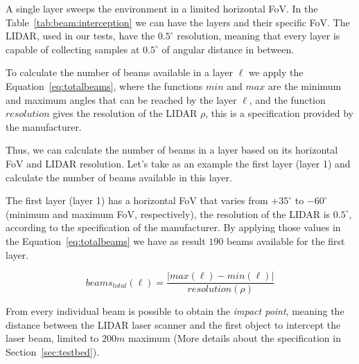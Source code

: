 A single layer sweeps the environment in a limited horizontal FoV. In the Table~\ref{tab:beam:interception} we can have the layers and their specific FoV. The LIDAR, used in our tests, have the $0.5^{\circ}$ resolution, meaning that every layer is capable of collecting samples at $0.5^{\circ}$ of angular distance in between. 

To calculate the number of beams available in a layer $\ell$ we apply the Equation~\ref{eq:totalbeams}, where the functions $min$ and $max$ are the minimum and maximum angles that can be reached by the layer $\ell$, and the function $resolution$ gives the resolution of the LIDAR $\rho$, this is a specification provided by the manufacturer. 

Thus, we can calculate the number of beams in a layer based on its horizontal FoV and LIDAR resolution. Let's take as an example the first layer (layer 1) and calculate the number of beams available in this layer. 

The first layer (layer 1) has a horizontal FoV that varies from $+35^\circ$ to $-60^\circ$ (minimum and maximum FoV, respectively), the resolution of the LIDAR is $0.5^\circ$, according to the specification of the manufacturer. By applying those values in the Equation~\ref{eq:totalbeams} we have as result $190$ beams available for the first layer.

\begin{equation}
\label{eq:totalbeams}
beams_{total}(\ell)=\frac{|max(\ell)-min(\ell)|}{resolution(\rho)}
\end{equation}

From every individual beam is possible to obtain the \textit{impact point}, meaning the distance between the LIDAR laser scanner and the first object to intercept the laser beam, limited to $200m$ maximum (More details about the specification in Section~\ref{sec:testbed}).

